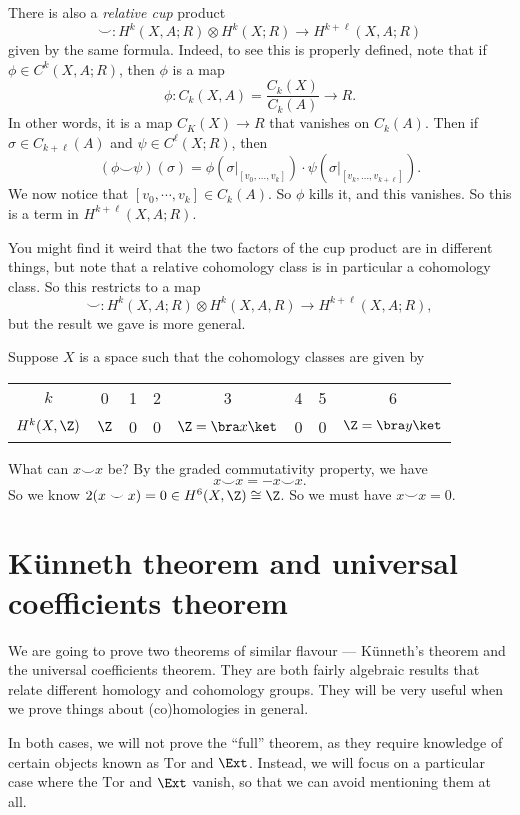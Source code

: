 \documentclass[a4paper]{article}
\begin{document}
There is also a \emph{relative cup} product
\[
  \smile: H^k(X, A; R) \otimes H^k(X; R) \to H^{k + \ell}(X, A; R)
\]
given by the same formula. Indeed, to see this is properly defined, note that if $\phi \in C^k(X, A; R)$, then $\phi$ is a map
\[
  \phi:C_k(X, A) = \frac{C_k(X)}{C_k(A)} \to R.
\]
In other words, it is a map $C_K(X) \to R$ that vanishes on $C_k(A)$. Then if $\sigma \in C_{k + \ell}(A)$ and $\psi \in C^\ell(X; R)$, then
\[
  (\phi \smile \psi)(\sigma) = \phi(\sigma|_{[v_0, \ldots, v_k]}) \cdot \psi(\sigma|_{[v_k, \ldots, v_{k + \ell}]}).
\]
We now notice that $[v_0, \cdots, v_k] \in C_k(A)$. So $\phi$ kills it, and this vanishes. So this is a term in $H^{k + \ell}(X, A; R)$.

You might find it weird that the two factors of the cup product are in different things, but note that a relative cohomology class is in particular a cohomology class. So this restricts to a map
\[
  \smile: H^k(X, A; R) \otimes H^k(X, A, R) \to H^{k + \ell}(X, A; R),
\]
but the result we gave is more general.

\begin{eg}
  Suppose $X$ is a space such that the cohomology classes are given by
  \begin{center}
    \begin{tabular}{cccccccc}
      $k$ & 0 & 1 & 2 & 3 & 4 & 5 & 6\\
      $H^k(X, \Z)$ & $\Z$ & 0 & 0 & $\Z = \bra x\ket$ & 0 & 0 & $\Z = \bra y\ket$
    \end{tabular}
  \end{center}
  What can $x \smile x$ be? By the graded commutativity property, we have
  \[
    x\smile x = - x \smile x.
  \]
  So we know $2(x \smile x) = 0 \in H^6(X, \Z) \cong \Z$. So we must have $x \smile x = 0$.
\end{eg}

\section{\texorpdfstring{K\"unneth}{Kunneth} theorem and universal coefficients theorem}
We are going to prove two theorems of similar flavour --- K\"unneth's theorem and the universal coefficients theorem. They are both fairly algebraic results that relate different homology and cohomology groups. They will be very useful when we prove things about (co)homologies in general.

In both cases, we will not prove the ``full'' theorem, as they require knowledge of certain objects known as $\mathrm{Tor}$ and $\Ext$. Instead, we will focus on a particular case where the $\mathrm{Tor}$ and $\Ext$ vanish, so that we can avoid mentioning them at all.
\end{document}
